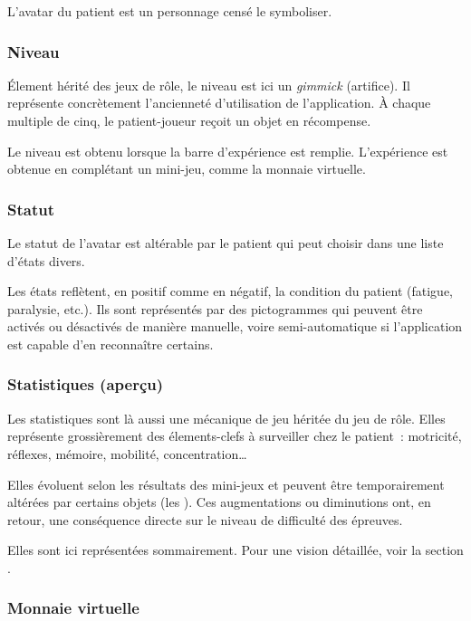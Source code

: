 \documentclass[a4paper,12pt,francais]{article}
\begin{document}
L'avatar du patient est un personnage censé le symboliser.

\subsubsection{Niveau}

Élement hérité des jeux de rôle, le niveau est ici un \emph{gimmick} (artifice). Il représente concrètement l'ancienneté d'utilisation de l'application. À chaque multiple de cinq, le patient-joueur reçoit un objet en récompense.

Le niveau est obtenu lorsque la barre d'expérience est remplie. L'expérience est obtenue en complétant un mini-jeu, comme la monnaie virtuelle.

\subsubsection{Statut}

Le statut de l'avatar est altérable par le patient qui peut choisir dans une liste d'états divers.

Les états reflètent, en positif comme en négatif, la condition du patient (fatigue, paralysie, etc.). Ils sont représentés par des pictogrammes qui peuvent être activés ou désactivés de manière manuelle, voire semi-automatique si l'application est capable d'en reconnaître certains.

\subsubsection{Statistiques (aperçu)}

Les statistiques sont là aussi une mécanique de jeu héritée du jeu de rôle. Elles représente grossièrement des élements-clefs à surveiller chez le patient~: motricité, réflexes, mémoire, mobilité, concentration\dots

Elles évoluent selon les résultats des mini-jeux et peuvent être temporairement altérées par certains objets (les ). Ces augmentations ou diminutions ont, en retour, une conséquence directe sur le niveau de difficulté des épreuves.

Elles sont ici représentées sommairement. Pour une vision détaillée, voir la section .

\subsubsection{Monnaie virtuelle}
\end{document}
